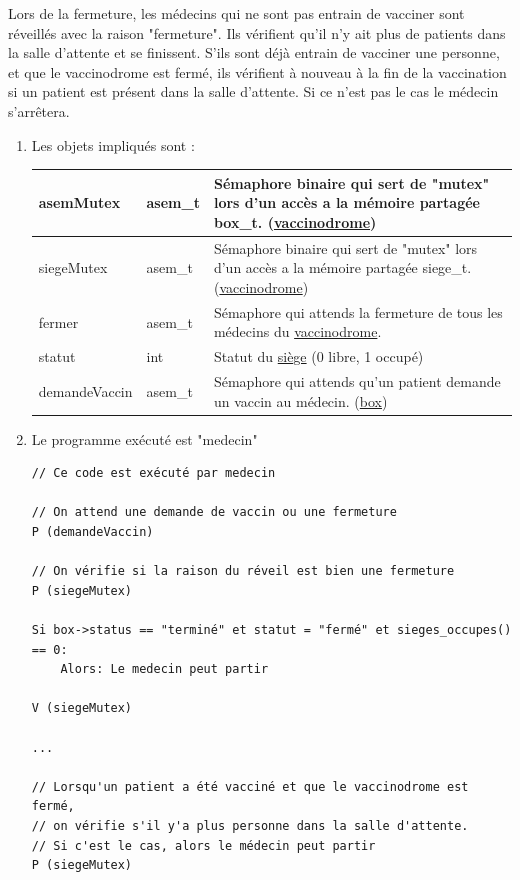 \documentclass[a4paper]{article}
\begin{document}
  Lors de la fermeture, les médecins qui ne sont pas entrain de vacciner sont réveillés avec la raison "fermeture". Ils vérifient qu'il n'y ait plus de patients dans la salle d'attente et se finissent.
  S'ils sont déjà entrain de vacciner une personne, et que le vaccinodrome est fermé, ils vérifient à nouveau à la fin de la vaccination si un patient est présent dans la salle d'attente. Si ce n'est pas le cas le médecin s'arrêtera.

\begin{enumerate}
    \item Les objets impliqués sont :

    \begin{tabularx}{\linewidth}{|l|l|>{\strut}X|}
      \hline%
          asemMutex & asem\_t & Sémaphore binaire qui sert de "mutex" lors d'un accès a la mémoire partagée box\_t. (\underline{vaccinodrome}) \\ \hline%
           siegeMutex & asem\_t & Sémaphore binaire qui sert de "mutex" lors d'un accès a la mémoire partagée siege\_t. (\underline{vaccinodrome}) \\ \hline%
    fermer & asem\_t & Sémaphore qui attends la fermeture de tous les médecins du \underline{vaccinodrome}. \\ \hline%
 statut & int & Statut du \underline{siège} (0 libre, 1 occupé) \\ \hline%
   demandeVaccin & asem\_t & Sémaphore qui attends qu'un patient demande un vaccin au médecin. (\underline{box}) \\ \hline%
    \end{tabularx}

  \item Le programme exécuté est "medecin"

\begin{verbatim}
// Ce code est exécuté par medecin

// On attend une demande de vaccin ou une fermeture
P (demandeVaccin)

// On vérifie si la raison du réveil est bien une fermeture
P (siegeMutex)

Si box->status == "terminé" et statut = "fermé" et sieges_occupes() == 0:
    Alors: Le medecin peut partir

V (siegeMutex)

...

// Lorsqu'un patient a été vacciné et que le vaccinodrome est fermé,
// on vérifie s'il y'a plus personne dans la salle d'attente.
// Si c'est le cas, alors le médecin peut partir
P (siegeMutex)


\end{verbatim}
\end{enumerate}
\end{document}
